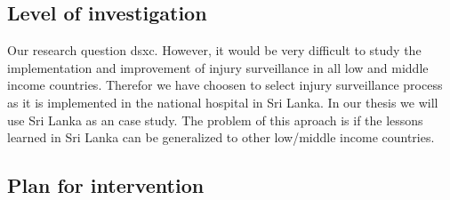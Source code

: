 \documentclass[UKenglish, 12pt]{article}
\begin{document}
\subsection{Level of investigation}
Our research question dsxc. However, it would be very difficult to study the implementation and improvement of injury surveillance in all low and middle income countries. Therefor we have choosen to select injury surveillance process as it is implemented in the national hospital in Sri Lanka. In our thesis we will use Sri Lanka as an case study. The problem of this aproach is if the lessons learned in Sri Lanka can be generalized to other low/middle income countries.

\subsection{Plan for intervention}

\pagebreak
\printbibliography
\end{document}
